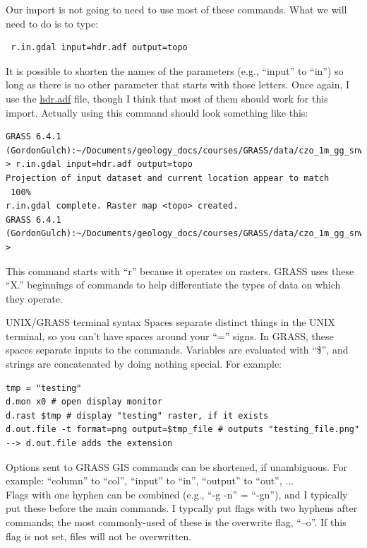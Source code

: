 \documentclass{book}
\begin{document}
Our import is not going to need to use most of these commands. What we will need to do is to type:
\begin{lstlisting}
 r.in.gdal input=hdr.adf output=topo
\end{lstlisting}
It is possible to shorten the names of the parameters (e.g., ``input'' to ``in'') so long as there is no other parameter that starts with those letters. Once again, I use the \url{hdr.adf} file, though I think that most of them should work for this import. Actually using this command should look something like this:
\begin{lstlisting}
GRASS 6.4.1 (GordonGulch):~/Documents/geology_docs/courses/GRASS/data/czo_1m_gg_snwOff/czo_1m_gg > r.in.gdal input=hdr.adf output=topo
Projection of input dataset and current location appear to match
 100%
r.in.gdal complete. Raster map <topo> created.
GRASS 6.4.1 (GordonGulch):~/Documents/geology_docs/courses/GRASS/data/czo_1m_gg_snwOff/czo_1m_gg > 
\end{lstlisting}

This command starts with ``r'' because it operates on rasters. GRASS uses these ``X.'' beginnings of commands to help differentiate the types of data on which they operate.

\begin{boxx}[!ht]
\begin{bclogo}[arrondi = 0.1, logo = \bcrosevents]{UNIX/GRASS terminal syntax}
Spaces separate distinct things in the UNIX terminal, so you can't have spaces around your ``='' signs. In GRASS, these spaces separate inputs to the commands. Variables are evaluated with ``\$'', and strings are concatenated by doing nothing special. For example:
\begin{lstlisting}
tmp = "testing"
d.mon x0 # open display monitor
d.rast $tmp # display "testing" raster, if it exists
d.out.file -t format=png output=$tmp_file # outputs "testing_file.png" --> d.out.file adds the extension
\end{lstlisting}
\end{bclogo}

Options sent to GRASS GIS commands can be shortened, if unambiguous. For example: ``column'' to ``col'', ``input'' to ``in'', ``output'' to ``out'', ... \\

Flags with one hyphen can be combined (e.g., ``-g -n'' = ``-gn''), and I typically put these before the main commands. I typcally put flags with two hyphens after commands; the most commonly-used of these is the overwrite flag, ``--o''. If this flag is not set, files will not be overwritten.
\caption{UNIX/GRASS terminal syntax}
\end{boxx}
\end{document}
